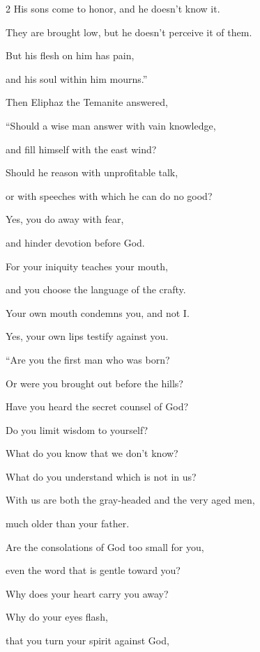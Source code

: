 \begin{multicols}{2}
	\myverse{}His sons come to honor, and he doesn’t know it.
	
	They are brought low, but he doesn’t perceive it of them.
	
	\myverse{}But his flesh on him has pain,
	
	and his soul within him mourns.”
	
	
	
	\mychapter{} \myverse*{}Then Eliphaz the Temanite answered,
	
	\quad\quad \myverse{}“Should a wise man answer with vain knowledge,
	
	and fill himself with the east wind?
	
	\myverse{}Should he reason with unprofitable talk,
	
	or with speeches with which he can do no good?
	
	\myverse{}Yes, you do away with fear,
	
	and hinder devotion before God.
	
	\myverse{}For your iniquity teaches your mouth,
	
	and you choose the language of the crafty.
	
	\myverse{}Your own mouth condemns you, and not I.
	
	Yes, your own lips testify against you.
	
	\vspace{\baselineskip}
	
	\myverse{}“Are you the first man who was born?
	
	Or were you brought out before the hills?
	
	\myverse{}Have you heard the secret counsel of God?
	
	Do you limit wisdom to yourself?
	
	\myverse{}What do you know that we don’t know?
	
	What do you understand which is not in us?
	
	\myverse{}With us are both the gray-headed and the very aged men,
	
	much older than your father.
	
	\myverse{}Are the consolations of God too small for you,
	
	even the word that is gentle toward you?
	
	\myverse{}Why does your heart carry you away?
	
	Why do your eyes flash,
	
	\myverse{}that you turn your spirit against God,
	

\end{multicols}
